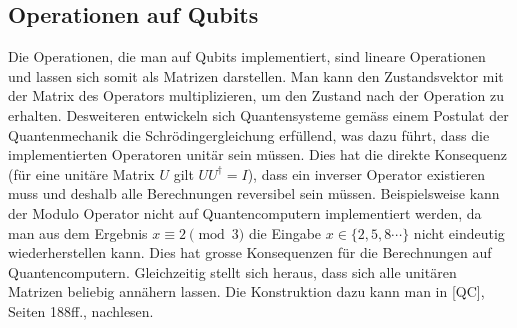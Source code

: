 
\subsection{Operationen auf Qubits}
Die Operationen, die man auf Qubits implementiert, sind lineare Operationen und lassen sich somit als Matrizen darstellen. Man kann den Zustandsvektor mit der Matrix des Operators multiplizieren, um den Zustand nach der Operation zu erhalten. Desweiteren entwickeln sich Quantensysteme gemäss einem Postulat der Quantenmechanik die Schrödingergleichung erfüllend, was dazu führt, dass die implementierten Operatoren unitär sein müssen. Dies hat die direkte Konsequenz (für eine unitäre Matrix $U$ gilt $UU^{\dagger} = I$), dass ein inverser Operator existieren muss und deshalb alle Berechnungen reversibel sein müssen. Beispielsweise kann der Modulo Operator nicht auf Quantencomputern implementiert werden, da man aus dem Ergebnis $x \equiv 2 \pmod{3}$ die Eingabe $x \in \{2, 5, 8\cdots\}$ nicht eindeutig wiederherstellen kann. Dies hat grosse Konsequenzen für die Berechnungen auf Quantencomputern. Gleichzeitig stellt sich heraus, dass sich alle unitären Matrizen beliebig annähern lassen. Die Konstruktion dazu kann man in [QC], Seiten 188ff., nachlesen.

